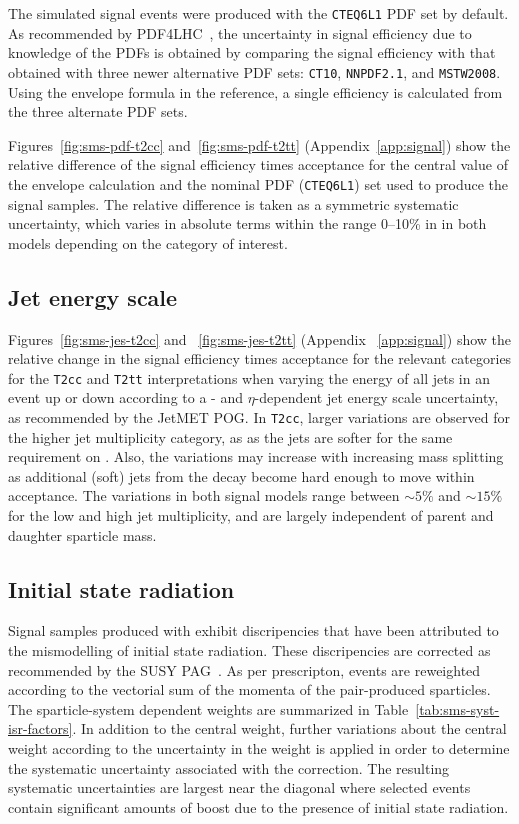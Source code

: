 The simulated signal events were produced with the \verb!CTEQ6L1! PDF
set by default.  As recommended by PDF4LHC~\cite{pdf4lhc}, the uncertainty
in signal efficiency due to knowledge of the PDFs is obtained by comparing 
the signal efficiency with that obtained with three newer alternative PDF 
sets: \verb!CT10!, \verb!NNPDF2.1!, and \verb!MSTW2008!. Using the envelope
formula in the reference, a single efficiency is calculated from the three alternate
PDF sets. 

Figures~\ref{fig:sms-pdf-t2cc} and~\ref{fig:sms-pdf-t2tt} 
(Appendix~\ref{app:signal}) show the relative difference of the signal 
efficiency times acceptance for the central value of the envelope calculation 
and the nominal PDF (\verb!CTEQ6L1!) set used to produce the signal 
samples. The relative difference is taken as a symmetric systematic 
uncertainty, which varies in absolute terms within the range 0--10\% in 
in both models depending on the category of interest.

\subsection{Jet energy scale\label{sec:sms-syst-jes}}

Figures~\ref{fig:sms-jes-t2cc} and ~\ref{fig:sms-jes-t2tt} 
(Appendix ~\ref{app:signal}) show the relative change in the 
signal efficiency times acceptance for the relevant categories for 
the \verb!T2cc! and \verb!T2tt! interpretations when varying the energy 
of all jets in an event up or down according to a \pt- and $\eta$-dependent 
jet energy scale uncertainty, as recommended by the JetMET POG. 
In \verb!T2cc!, larger variations are observed for the higher 
jet multiplicity category, as as the jets are softer for the same 
requirement on \scalht. Also, the variations may increase with 
increasing mass splitting as additional (soft) jets from the decay 
become hard enough to move within acceptance. The variations in both 
signal models range between $\sim5\%$ and $\sim15\%$ for the low 
and high jet multiplicity, and are largely independent of parent 
and daughter sparticle mass. 

\subsection{Initial state radiation\label{sec:sms-syst-isr}}

Signal samples produced with \MADGRAPH exhibit discripencies that 
have been attributed to the mismodelling of initial state radiation.
These discripencies are corrected as recommended by the SUSY 
PAG~\cite{susy-isrrw}. As per prescripton, events are reweighted
according to the vectorial sum of the momenta of the pair-produced
sparticles. The sparticle-system \Pt dependent weights are summarized in  
Table~\ref{tab:sms-syst-isr-factors}.   In addition to the central weight, 
further variations about the central weight according to the uncertainty 
in the weight is applied in order to determine the systematic uncertainty
associated with the correction. The resulting systematic uncertainties 
are largest near the diagonal where selected events contain significant 
amounts of boost due to the presence of initial state radiation. 

